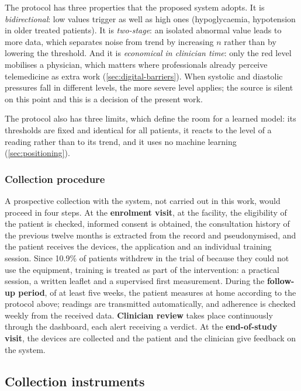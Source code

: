 The protocol has three properties that the proposed system adopts. It is \emph{bidirectional}: low values trigger as well as high ones (hypoglycaemia, hypotension in older treated patients). It is \emph{two-stage}: an isolated abnormal value leads to more data, which separates noise from trend by increasing $n$ rather than by lowering the threshold. And it is \emph{economical in clinician time}: only the red level mobilises a physician, which matters where professionals already perceive telemedicine as extra work (\cref{sec:digital-barriers}). When systolic and diastolic pressures fall in different levels, the more severe level applies; the source is silent on this point and this is a decision of the present work.

The protocol also has three limits, which define the room for a learned model: its thresholds are fixed and identical for all patients, it reacts to the level of a reading rather than to its trend, and it uses no machine learning (\cref{sec:positioning}).

\subsubsection{Collection procedure}\label{sec:procedure}

A prospective collection with the system, not carried out in this work, would proceed in four steps. At the \textbf{enrolment visit}, at the facility, the eligibility of the patient is checked, informed consent is obtained, the consultation history of the previous twelve months is extracted from the record and pseudonymised, and the patient receives the devices, the application and an individual training session. Since 10.9\% of patients withdrew in the trial of \textcite{mihevc2025} because they could not use the equipment, training is treated as part of the intervention: a practical session, a written leaflet and a supervised first measurement. During the \textbf{follow-up period}, of at least five weeks, the patient measures at home according to the protocol above; readings are transmitted automatically, and adherence is checked weekly from the received data. \textbf{Clinician review} takes place continuously through the dashboard, each alert receiving a verdict. At the \textbf{end-of-study visit}, the devices are collected and the patient and the clinician give feedback on the system.

\subsection{Collection instruments}\label{sec:instruments}

